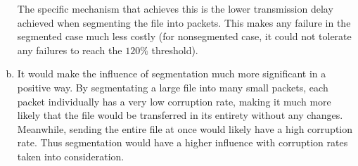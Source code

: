 \documentclass[11pt]{article}
\begin{document}
\begin{enumerate}[(a)]
      The specific mechanism that achieves this is the lower transmission delay
      achieved when segmenting the file into packets. This makes any failure in
      the segmented case much less costly (for nonsegmented case, it could not
      tolerate any failures to reach the $120\%$ threshold).
    \item
      It would make the influence of segmentation much more significant in a positive
      way. By segmentating a large file into many small packets, each packet individually
      has a very low corruption rate, making it much more likely that the file would
      be transferred in its entirety without any changes. Meanwhile, sending the entire file at once would likely have a high corruption rate. Thus segmentation would have a
      higher influence with corruption rates taken into consideration.
  \end{enumerate}
\end{document}

